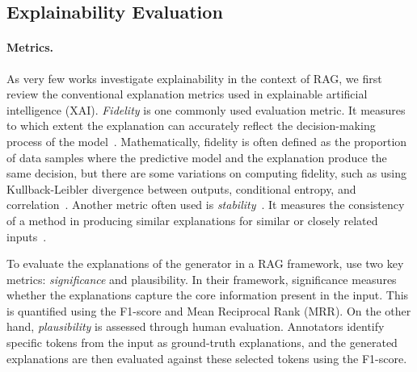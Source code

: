 \subsection{Explainability Evaluation}

\paragraph{Metrics.} 
As very few works investigate explainability in the context of RAG, we first review the conventional explanation metrics used in explainable artificial intelligence (XAI). \textit{Fidelity} is one commonly used evaluation metric. It measures to which extent the explanation can accurately reflect the decision-making process of the model~\cite{alangari2023exploring}. Mathematically, fidelity is often defined as the proportion of data samples where the predictive model and the explanation produce the same decision, but there are some variations on computing fidelity, such as using Kullback-Leibler divergence between outputs, conditional entropy, and correlation~\cite{nauta2023anecdotal}. Another metric often used is \textit{stability}~\cite{ghorbani2019interpretation,li2020evaluating,plumb2020regularizing}. It measures the consistency of a method in producing similar explanations for similar or closely related inputs~\cite{vilone2021notions}.

To evaluate the explanations of the generator in a RAG framework, \citet{sudhi2024rag} use two key metrics: \textit{significance} and plausibility. In their framework, significance measures whether the explanations capture the core information present in the input. This is quantified using the F1-score and Mean Reciprocal Rank (MRR). On the other hand, \textit{plausibility} is assessed through human evaluation. Annotators identify specific tokens from the input as ground-truth explanations, and the generated explanations are then evaluated against these selected tokens using the F1-score.


